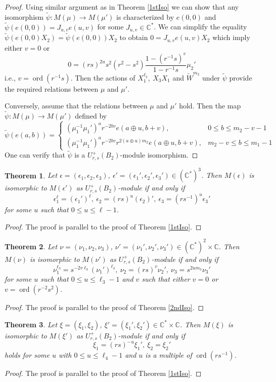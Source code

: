 \documentclass[12 pt,reqno]{amsart}
\numberwithin{equation}{section}
\DeclareMathOperator{\ord}{ord}
\newtheorem{thm}{Theorem}[section]
\newtheorem{theorem}[thm]{Theorem}
\theoremstyle{definition}
\theoremstyle{definition}
\theoremstyle{remark}
\theoremstyle{remark}
\begin{document}
\begin{proof}
    Using similar argument as in Theorem \ref{1stIso} we can show that any isomorphism $\tilde{\psi}: M(\mu) \rightarrow M(\mu')$ is characterized by $e(0,0)$ and $\tilde{\psi}\left(e(0,0)\right)=J_{u,v}e(u,v)$ for some $J_{u,v}\in \mathbb{C}^*$. We can simplify the equality $\tilde{\psi}(e(0,0)X_2)=\tilde{\psi}(e(0,0))X_2$ to obtain $0=J_{u,v}e(u,v)X_2$ which imply either $v=0$ or 
    \[0=(rs)^{2u}s^2(r^2-s^2)\displaystyle\frac{1-(r^{-1}s)^v}{1-r^{-1}s}\mu_2'\] i.e.,  $v=\ord(r^{-1}s)$. Then the actions of $X_1^{\ell_2}, \ X_3X_1$ and $\tilde{W}^{m_2}$ under $\tilde{\psi}$ provide the required relations between $\mu$ and $\mu'$. 
    \par Conversely, assume that the relations between $\mu$ and $\mu'$ hold. Then the map $\tilde{\psi}:M(\mu)\rightarrow M(\mu')$ defined by
\[\tilde{\psi}\left(e(a,b)\right)=\begin{cases}
(\mu_1^{-1}\mu_1')^a r^{-2bv}e(a\oplus u,b+v), & 0 \leq b \leq m_2-v-1\\
(\mu_1^{-1}\mu_1')^a r^{-2bv}r^{2(a \oplus u)m_2}e(a\oplus u,b+v), & m_2-v \leq b \leq m_1-1   
\end{cases}\]
One can verify that $\tilde{\psi}$ is a $U_{r,s}^+(B_2)$-module isomorphism.
\end{proof}
\begin{thm}
 Let   $ \epsilon = (\epsilon_1, \epsilon_2, \epsilon_3)$, $  \epsilon' = (\epsilon_1', \epsilon_2', \epsilon_3')  \in (\mathbb{C}^*)^3$. Then $M(\epsilon)$ is isomorphic to $M(\epsilon')$ as $U_{r,s}^+(B_2)$-module if and only if 
 \[\epsilon_1^{\ell}=(\epsilon_1')^{\ell}, \ \epsilon_2=(rs)^u(\epsilon_2)', \ \epsilon_3=(rs^{-1})^u\epsilon_3'\] for some $u$ such that $0 \leq u \leq \ell-1$.
\end{thm}
\begin{proof}
  The proof is parallel to the proof of Theorem \ref{1stIso}.
\end{proof}
\begin{theorem}
    Let $ \nu = (\nu_1, \nu_2, \nu_3)$, $ \nu' = (\nu_1', \nu_2', \nu_3')\in (\mathbb{C}^*)^2 \times \mathbb{C} $. Then $M(\nu)$ is isomorphic to $M(\nu')$ as $U_{r,s}^+(B_2)$-module if and only if 
    \[\nu_1^{\ell_3}=s^{-2v\ell_3}(\nu_1')^{\ell_3}, \ \nu_2=(rs)^v\nu_2', \ \nu_3=s^{2um_3}\nu_3'\] for some $u$ such that $0 \leq u \leq \ell_3-1$ and $v$ such that either $v=0$ or $v=\ord(r^{-2}s^2)$.
\end{theorem}
\begin{proof}
   The proof is parallel to the proof of Theorem \ref{2ndIso}.
\end{proof}
\begin{theorem}\label{5thIso}
    Let $ \xi = (\xi_1, \xi_2)$, $ \xi' = (\xi_1', \xi_2')\in \mathbb{C}^*\times \mathbb{C} $. Then $M(\xi)$ is isomorphic to $M(\xi')$ as $U_{r,s}^+(B_2)$-module if and only if
    \[\xi_1=(rs)^{-u}\xi_1', \ \xi_2=\xi_2'\] holds for some $u$ with $0 \leq u \leq \ell_4-1$ and $u$ is a multiple of $\ord(rs^{-1})$.
\end{theorem}
\begin{proof}
    The proof is parallel to the proof of Theorem \ref{1stIso}.
\end{proof}
\end{document}
